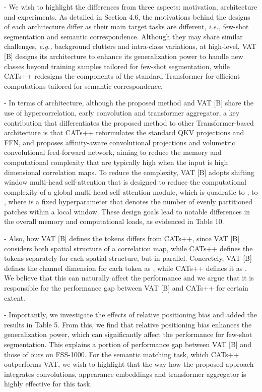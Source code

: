 \documentclass[11pt,draftclsnofoot,onecolumn]{IEEEtran}
\begin{document}
- We wish to highlight the differences from three aspects: motivation, architecture and experiments. As detailed in Section 4.6, the motivations behind the designs of each architecture differ as their main target tasks are different, \textit{i.e.,} few-shot segmentation and semantic correspondence. Although they may share similar challenges, \textit{e.g.,} background clutters and intra-class variations, at high-level, VAT [B] designs its architecture to enhance its generalization power to handle new classes beyond training samples tailored for few-shot segmentation, while CATs++ redesigns the components of the standard Transformer for efficient computations tailored for semantic correspondence.

- In terms of architecture, although the proposed method and VAT [B] share the use of hypercorrelation, early convolution and transformer aggregator, a key contribution that differentiates the proposed method to other Transformer-based architecture is that CATs++ reformulates the standard QKV projections and FFN, and proposes  affinity-aware convolutional projections and volumetric convolutional feed-forward network, aiming to reduce the memory and computational complexity that are typically high when the input is high dimensional correlation maps. To reduce the complexity, VAT [B] adopts shifting window multi-head self-attention that is designed to reduce the computational complexity of a global multi-head self-attention module, which is quadratic to , to , where  is a fixed hyperparameter that denotes the number of evenly partitioned patches within a local window. These  design goals lead to notable differences in the overall memory and computational loads, as evidenced in Table 10.


- Also, how VAT [B] defines the tokens differs from CATs++, since VAT [B] considers both spatial structure of a correlation map, while CATs++ defines the tokens separately for each spatial structure, but in parallel. Concretely, VAT [B] defines the channel dimension for each token as , while CATs++ defines it as . We believe that this can naturally affect the performance and we argue that it is responsible for the performance gap between VAT [B] and CATs++ for certain extent. 

- Importantly, we investigate the effects of relative positioning bias and added the results in Table 5. From this, we find that relative positioning bias enhances the generalization power, which can significantly affect the performance for few-shot segmentation. This explains a  portion of performance gap between VAT [B]  and those of ours on FSS-1000. For the semantic matching task, which CATs++ outperforms VAT, we wish to highlight that the way how the proposed approach integrates convolutions, appearance embeddings and transformer aggregator is highly effective for this task.
\end{document}
